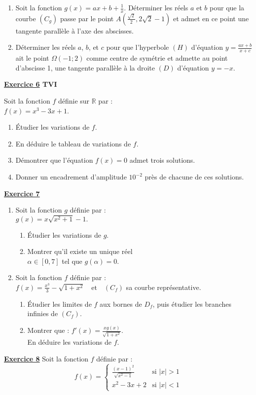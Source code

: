 \documentclass[12pt,a4paper]{article}
\begin{document}
\begin{multicols}{2}
\begin{enumerate}
    \item Soit la fonction \( g(x) = ax + b + \frac{1}{x} \). Déterminer les réels \( a \) et \( b \) pour que la courbe \( (C_g) \) passe par le point \( A\left(\frac{\sqrt{2}}{2}, 2\sqrt{2} - 1 \right) \) et admet en ce point une tangente parallèle à l'axe des abscisses.
    
    \item Déterminer les réels \( a \), \( b \), et \( c \) pour que l'hyperbole \( (H) \) d'équation \( y = \frac{ax + b}{x + c} \) ait le point \( \Omega(-1; 2) \) comme centre de symétrie et admette au point d'abscisse 1, une tangente parallèle à la droite \( (D) \) d'équation \( y = -x \).
\end{enumerate}
\textbf{\underline{Exercice 6} TVI}

Soit la fonction \( f \) définie sur \( \mathbb{R} \) par :\\ \( f(x) = x^3 - 3x + 1 \).

\begin{enumerate}
    \item Étudier les variations de \( f \).
    \item En déduire le tableau de variations de \( f \).
    \item Démontrer que l'équation \( f(x) = 0 \) admet trois solutions.
    \item Donner un encadrement d'amplitude \( 10^{-2} \) près de chacune de ces solutions.
\end{enumerate}
\textbf{\underline{Exercice 7}}
\begin{enumerate}
    \item Soit la fonction \( g \) définie par :\\ 
\( g(x) = x\sqrt{x^2 + 1} - 1. \)
    \begin{enumerate}
        \item Étudier les variations de \( g \).
        \item Montrer qu'il existe un unique réel\\ \( \alpha \in [0, 7] \) tel que \( g(\alpha) = 0 \).
    \end{enumerate}
    \item Soit la fonction \( f \) définie par :\\ 
\( f(x) = \frac{x^3}{3} - \sqrt{1 + x^2} \quad \text{et} \quad (C_f) \) sa courbe représentative.
    \begin{enumerate}
        \item Étudier les limites de \( f \) aux bornes de \( D_f \), puis étudier les branches infinies de \( (C_f) \).
        \item Montrer que : \( f'(x) = \frac{xg(x)}{\sqrt{1 + x^2}} \).\\ 
        En déduire les variations de \( f \).
    \end{enumerate}
\end{enumerate}
\textbf{\underline{Exercice 8}}
Soit la fonction \( f \) définie par :
\[
f(x) = 
\begin{cases}
\frac{(x - 1)^2}{\sqrt{x^2 - 1}} & \text{si } |x| > 1 \\
x^2 - 3x + 2 & \text{si } |x| < 1
\end{cases}
\]


\end{multicols}
\end{document}
